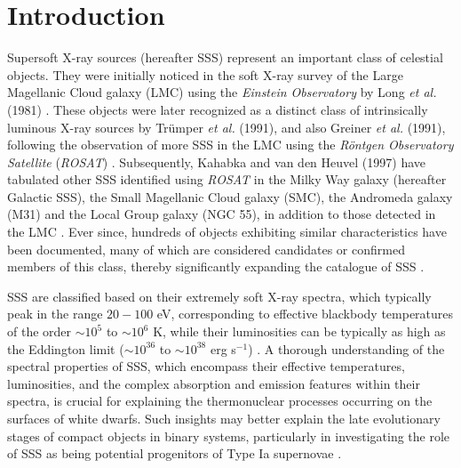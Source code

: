 \section{Introduction}
    
    Supersoft X-ray sources (hereafter SSS) represent an important class of celestial objects. They were initially noticed in the soft X-ray survey  of the Large Magellanic Cloud galaxy (LMC) using the \textit{Einstein Observatory} by Long \textit{et al.} (1981) \cite{long81}. These objects were later recognized as a distinct class of intrinsically luminous X-ray sources by Trümper \textit{et al.} (1991), and also Greiner \textit{et al.} (1991), following the observation of more SSS in the LMC using the \textit{R\"{o}ntgen Observatory Satellite} (\textit{ROSAT}) \cite{trumper1991x, greiner1991rosat}. Subsequently, Kahabka and van den Heuvel (1997) have tabulated other SSS identified using \textit{ROSAT} in the Milky Way galaxy (hereafter Galactic SSS), the Small Magellanic Cloud galaxy (SMC), the Andromeda galaxy (M31) and the Local Group galaxy (NGC 55), in addition to those detected in the LMC \cite{kahabka97}. Ever since, hundreds of objects exhibiting similar characteristics have been documented, many of which are considered candidates or confirmed members of this class, thereby significantly expanding the catalogue of SSS \cite{kahabkatrumper1996, steinerdiaz1998, greiner2000, pietsch2003deep, di2003luminous, orio2010census, henze2010recent, sturm2012new, galiullin2021populations}.
    
    SSS are classified based on their extremely soft X-ray spectra, which typically peak in the range $20-100$ eV, corresponding to effective blackbody temperatures of the order $\sim 10^5$ to $\sim 10^6$ K, while their luminosities can be typically as high as the Eddington limit ($\sim 10^{36}$ to $\sim 10^{38}$ erg s$^{-1}$) \cite{kahabka06}. A thorough understanding of the spectral properties of SSS, which encompass their effective temperatures, luminosities, and the complex absorption and emission features within their spectra, is crucial for explaining the thermonuclear processes occurring on the surfaces of white dwarfs. Such insights may better explain the late evolutionary stages of compact objects in binary systems, particularly in investigating the role of SSS as being potential progenitors of Type Ia supernovae \cite{di2006luminous}.
    
